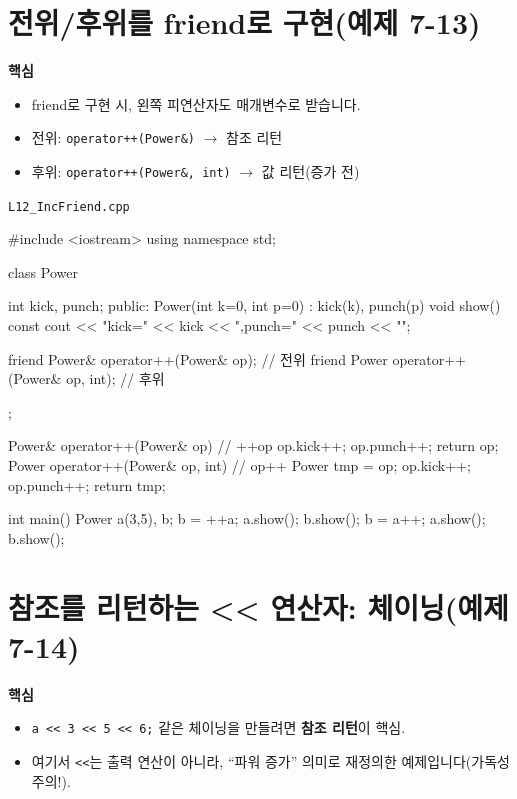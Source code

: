 \documentclass[11pt,a4paper]{article}
\newcommand{\filetag}[1]{\texttt{\color{Accent}#1}}
\begin{document}
\section{전위/후위를 friend로 구현(예제 7-13)}
\begin{GoalBox}
\textbf{핵심}
\begin{itemize}[leftmargin=18pt]
  \item friend로 구현 시, 왼쪽 피연산자도 매개변수로 받습니다.
  \item 전위: \texttt{operator++(Power\&)} $\rightarrow$ 참조 리턴
  \item 후위: \texttt{operator++(Power\&, int)} $\rightarrow$ 값 리턴(증가 전)
\end{itemize}
\end{GoalBox}

\noindent\filetag{L12\_IncFriend.cpp}
\begin{cppcode}
#include <iostream>
using namespace std;

class Power {
    int kick, punch;
public:
    Power(int k=0, int p=0) : kick(k), punch(p) {}
    void show() const { cout << "kick=" << kick << ",punch=" << punch << "\n"; }

    friend Power& operator++(Power& op);        // 전위
    friend Power operator++(Power& op, int);    // 후위
};

Power& operator++(Power& op) { // ++op
    op.kick++; op.punch++;
    return op;
}
Power operator++(Power& op, int) { // op++
    Power tmp = op;
    op.kick++; op.punch++;
    return tmp;
}

int main() {
    Power a(3,5), b;
    b = ++a; a.show(); b.show();
    b = a++; a.show(); b.show();
}
\end{cppcode}

\section{참조를 리턴하는 << 연산자: 체이닝(예제 7-14)}
\begin{GoalBox}
\textbf{핵심}
\begin{itemize}[leftmargin=18pt]
  \item \texttt{a << 3 << 5 << 6;} 같은 체이닝을 만들려면 \textbf{참조 리턴}이 핵심.
  \item 여기서 \texttt{<<}는 출력 연산이 아니라, ``파워 증가'' 의미로 재정의한 예제입니다(가독성 주의!).
\end{itemize}
\end{GoalBox}
\end{document}
